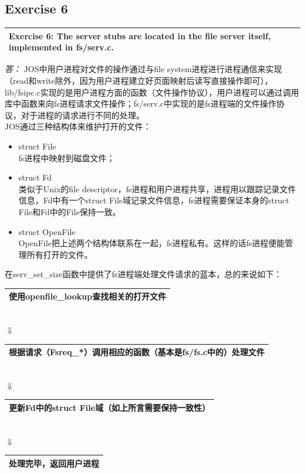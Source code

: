 \documentclass[11pt,a4paper]{article}
\newcommand{\exercise}[2]{
\begin{tabular}{|p{\textwidth}|}
\hline
#1: #2\\
\hline
\end{tabular}
\textit{\large{答：}}}
\begin{document}
\subsection{Exercise 6}
\exercise{Exercise 6}{The server stubs are located in the file server itself, implemented in fs/serv.c.}
JOS中用户进程对文件的操作通过与file system进程进行进程通信来实现（read和write除外，因为用户进程建立好页面映射后读写直接操作即可），lib/fsipc.c实现的是用户进程方面的函数（文件操作协议），用户进程可以通过调用库中函数来向fs进程请求文件操作；fs/serv.c中实现的是fs进程端的文件操作协议，对于进程的请求进行不同的处理。\\
JOS通过三种结构体来维护打开的文件：\\
\begin{itemize}
\item struct File\\
fs进程中映射到磁盘文件；
\item struct Fd\\
类似于Unix的file descriptor，fs进程和用户进程共享，进程用以跟踪记录文件信息，Fd中有一个struct File域记录文件信息，fs进程需要保证本身的struct File和Fd中的File保持一致。
\item struct OpenFile\\
OpenFile把上述两个结构体联系在一起，fs进程私有。这样的话fs进程便能管理所有打开的文件。
\end{itemize}
在serv\_set\_size函数中提供了fs进程端处理文件请求的蓝本，总的来说如下：\\
\begin{tabular}{|p{}|}
\hline
使用openfile\_lookup查找相关的打开文件\\
\hline
\end{tabular}
\\$\Downarrow$\\
\begin{tabular}{|p{}|}
\hline
根据请求（Fsreq\_*）调用相应的函数（基本是fs/fs.c中的）处理文件\\
\hline
\end{tabular}
\\$\Downarrow$\\
\begin{tabular}{|p{}|}
\hline
更新Fd中的struct File域（如上所言需要保持一致性）\\
\hline
\end{tabular}
\\$\Downarrow$\\
\begin{tabular}{|p{}|}
\hline
处理完毕，返回用户进程\\
\hline
\end{tabular}
\end{document}
